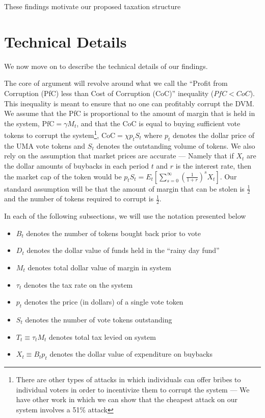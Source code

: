 \documentclass[12pt]{article}
\begin{document}
  These findings motivate our proposed taxation structure

  \clearpage
  \newpage

\section{Technical Details}

  We now move on to describe the technical details of our findings.

  The core of argument will revolve around what we call the ``Profit from Corruption (PfC) less than
  Cost of Corruption (CoC)'' inequality ($PfC < CoC$). This inequality is meant to ensure that no
  one can profitably corrupt the DVM. We assume that the PfC is proportional to the amount of margin
  that is held in the system, $\text{PfC} = \gamma M_t$, and that the CoC is equal to buying
  sufficient vote tokens to corrupt the system\footnote{There are other types of attacks in which
  individuals can offer bribes to individual voters in order to incentivize them to corrupt the
  system --- We have other work in which we can show that the cheapest attack on our system involves
  a 51\% attack}, $\text{CoC} = \chi p_t S_t$ where $p_t$ denotes the dollar price of the UMA vote
  tokens and $S_t$ denotes the outstanding volume of tokens. We also rely on the assumption that
  market prices are accurate --- Namely that if $X_t$ are the dollar amounts of buybacks in each
  period $t$ and $r$ is the interest rate, then the market cap of the token would be
  $p_t S_t = E_t \left[ \sum_{s=0}^{\infty} \left(\frac{1}{1 + r}\right)^s X_t \right]$. Our
  standard assumption will be that the amount of margin that can be stolen is $\frac{1}{2}$ and the
  number of tokens required to corrupt is $\frac{1}{2}$.

  In each of the following subsections, we will use the notation presented below

  \begin{itemize}
    \item $B_t$ denotes the number of tokens bought back prior to vote
    \item $D_t$ denotes the dollar value of funds held in the ``rainy day fund''
    \item $M_t$ denotes total dollar value of margin in system
    \item $\tau_t$ denotes the tax rate on the system
    \item $p_t$ denotes the price (in dollars) of a single vote token
    \item $S_t$ denotes the number of vote tokens outstanding
    \item $T_t \equiv \tau_t M_t$ denotes total tax levied on system
    \item $X_t \equiv B_t p_t$ denotes the dollar value of expenditure on buybacks
  \end{itemize}
\end{document}
